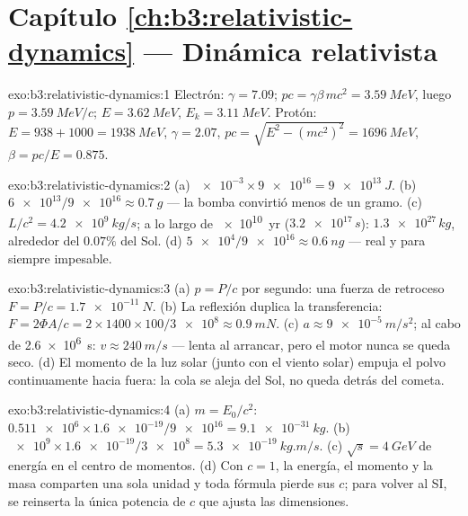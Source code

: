 \section*{Capítulo \ref{ch:b3:relativistic-dynamics} --- Dinámica relativista}

\begin{solution}{exo:b3:relativistic-dynamics:1}
Electrón: $\gamma = 7.09$; $pc = \gamma\beta\,mc^2 = \qty{3.59}{MeV}$,
luego $p = \qty{3.59}{MeV}/c$; $E = \qty{3.62}{MeV}$, $E_k =
\qty{3.11}{MeV}$. Protón: $E = 938 + 1000 = \qty{1938}{MeV}$, $\gamma
= 2.07$, $pc = \sqrt{E^2 - (mc^2)^2} = \qty{1696}{MeV}$, $\beta =
pc/E = 0.875$.
\end{solution}

\begin{solution}{exo:b3:relativistic-dynamics:2}
(a) $\num{e-3} \times \num{9e16} = \qty{9e13}{J}$. (b) $\num{6e13}/
\num{9e16} \approx \qty{0.7}{g}$ --- la bomba convirtió menos de un
gramo. (c) $L/c^2 = \qty{4.2e9}{kg/s}$; a lo largo de \qty{e10}{yr}
($\num{3.2e17}{}\,\unit{s}$): $\num{1.3e27}{}\,\unit{kg}$, alrededor del
$0.07\%$ del Sol. (d) $\num{5e4}/\num{9e16} \approx
\qty{0.6}{ng}$ --- real y para siempre impesable.
\end{solution}

\begin{solution}{exo:b3:relativistic-dynamics:3}
(a) $p = P/c$ por segundo: una fuerza de retroceso $F = P/c = \qty{1.7e-11}{N}$.
(b) La reflexión duplica la transferencia: $F = 2\Phi A/c =
2 \times 1400 \times 100/\num{3e8} \approx \qty{0.9}{mN}$. (c) $a
\approx \qty{9e-5}{m/s^2}$; al cabo de \qty{2.6e6}{s}: $v \approx
\qty{240}{m/s}$ --- lenta al arrancar, pero el motor nunca se queda seco. (d)
El momento de la luz solar (junto con el viento solar) empuja el polvo
continuamente hacia fuera: la cola se aleja del Sol, no queda detrás del
cometa.
\end{solution}

\begin{solution}{exo:b3:relativistic-dynamics:4}
(a) $m = E_0/c^2$: $\num{0.511e6} \times \num{1.6e-19}/\num{9e16} =
\qty{9.1e-31}{kg}$. (b) $\num{e9} \times \num{1.6e-19}/\num{3e8} =
\qty{5.3e-19}{kg.m/s}$. (c) $\sqrt s = \qty{4}{GeV}$ de energía en el
centro de momentos. (d) Con $c = 1$, la energía, el momento y la
masa comparten una sola unidad y toda fórmula pierde sus $c$; para volver al
SI, se reinserta la única potencia de $c$ que ajusta las dimensiones.
\end{solution}

